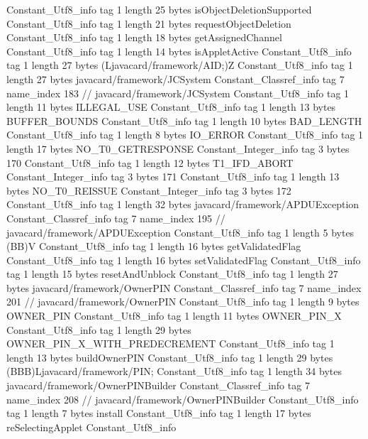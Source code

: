 {{{		}
		Constant_Utf8_info {
			tag	1
			length	25
			bytes	isObjectDeletionSupported
		}
		Constant_Utf8_info {
			tag	1
			length	21
			bytes	requestObjectDeletion
		}
		Constant_Utf8_info {
			tag	1
			length	18
			bytes	getAssignedChannel
		}
		Constant_Utf8_info {
			tag	1
			length	14
			bytes	isAppletActive
		}
		Constant_Utf8_info {
			tag	1
			length	27
			bytes	(Ljavacard/framework/AID;)Z
		}
		Constant_Utf8_info {
			tag	1
			length	27
			bytes	javacard/framework/JCSystem
		}
		Constant_Classref_info {
			tag	7
			name_index	183		// javacard/framework/JCSystem
		}
		Constant_Utf8_info {
			tag	1
			length	11
			bytes	ILLEGAL_USE
		}
		Constant_Utf8_info {
			tag	1
			length	13
			bytes	BUFFER_BOUNDS
		}
		Constant_Utf8_info {
			tag	1
			length	10
			bytes	BAD_LENGTH
		}
		Constant_Utf8_info {
			tag	1
			length	8
			bytes	IO_ERROR
		}
		Constant_Utf8_info {
			tag	1
			length	17
			bytes	NO_T0_GETRESPONSE
		}
		Constant_Integer_info {
			tag	3
			bytes	170
		}
		Constant_Utf8_info {
			tag	1
			length	12
			bytes	T1_IFD_ABORT
		}
		Constant_Integer_info {
			tag	3
			bytes	171
		}
		Constant_Utf8_info {
			tag	1
			length	13
			bytes	NO_T0_REISSUE
		}
		Constant_Integer_info {
			tag	3
			bytes	172
		}
		Constant_Utf8_info {
			tag	1
			length	32
			bytes	javacard/framework/APDUException
		}
		Constant_Classref_info {
			tag	7
			name_index	195		// javacard/framework/APDUException
		}
		Constant_Utf8_info {
			tag	1
			length	5
			bytes	(BB)V
		}
		Constant_Utf8_info {
			tag	1
			length	16
			bytes	getValidatedFlag
		}
		Constant_Utf8_info {
			tag	1
			length	16
			bytes	setValidatedFlag
		}
		Constant_Utf8_info {
			tag	1
			length	15
			bytes	resetAndUnblock
		}
		Constant_Utf8_info {
			tag	1
			length	27
			bytes	javacard/framework/OwnerPIN
		}
		Constant_Classref_info {
			tag	7
			name_index	201		// javacard/framework/OwnerPIN
		}
		Constant_Utf8_info {
			tag	1
			length	9
			bytes	OWNER_PIN
		}
		Constant_Utf8_info {
			tag	1
			length	11
			bytes	OWNER_PIN_X
		}
		Constant_Utf8_info {
			tag	1
			length	29
			bytes	OWNER_PIN_X_WITH_PREDECREMENT
		}
		Constant_Utf8_info {
			tag	1
			length	13
			bytes	buildOwnerPIN
		}
		Constant_Utf8_info {
			tag	1
			length	29
			bytes	(BBB)Ljavacard/framework/PIN;
		}
		Constant_Utf8_info {
			tag	1
			length	34
			bytes	javacard/framework/OwnerPINBuilder
		}
		Constant_Classref_info {
			tag	7
			name_index	208		// javacard/framework/OwnerPINBuilder
		}
		Constant_Utf8_info {
			tag	1
			length	7
			bytes	install
		}
		Constant_Utf8_info {
			tag	1
			length	17
			bytes	reSelectingApplet
		}
		Constant_Utf8_info {
}}}
